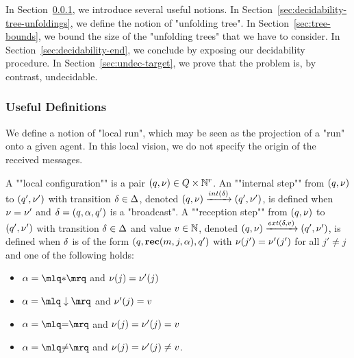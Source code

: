 In Section~\ref{sec:decidability-defs}, we introduce several useful notions. In Section~\ref{sec:decidability-tree-unfoldings}, we define the notion of "unfolding tree". In Section~\ref{sec:tree-bounds}, we bound the size of the "unfolding trees" that we have to consider. In Section~\ref{sec:decidability-end}, we conclude by exposing our decidability procedure. 
In Section~\ref{sec:undec-target}, we prove that the \TARGET problem is, by contrast, undecidable.

\subsubsection{Useful Definitions}
\label{sec:decidability-defs}

We define a notion of "local run", which may be seen as the projection of a "run" onto a given agent. In this local vision, we do not specify the origin of the received messages.
	
\AP A ""local configuration"" is a pair $(q, \nu) \in Q \times \mathbb{N}^r$.  
\AP An ""internal step"" from $(q,\nu)$ to $(q',\nu')$ with transition $\delta \in \Delta$, denoted $(q,\localdata) \intstep{\atrans} (q',\localdata')$, is defined when $\nu = \nu'$ and $\delta =(q, \alpha, q')$ is a "broadcast".  
\AP A ""reception step"" from $(q,\nu)$ to $(q',\nu')$ with transition $\delta \in \Delta$ and value $v \in \mathbb{N}$, denoted $(q,\localdata) \extbr{\atrans}{\aval} (q',\localdata')$, is defined when $\delta$ is of the form $(q,\textbf{rec}(m, j, \alpha),q')$ with $\nu(j') = \nu'(j')$ for all $j' \neq j$ and one of the following holds:
	
	\begin{minipage}[t]{6cm}
		\begin{itemize}
			\item $\anact = \quotemarks{\dummyact}$ 
			and $\nu(j) = \nu'(j)$
			\item $\anact = \quotemarks{\enregact}$ and $\nu'(j) = v$
		\end{itemize}
	\end{minipage}
	\begin{minipage}[t]{6cm}
		\begin{itemize}
			\item $\anact = \quotemarks{\eqtestact}$ and $\nu(j) = \nu'(j)= v$
			\item $\anact = \quotemarks{\diseqtestact}$ and $\nu(j) = \nu'(j) \ne v$.
		\end{itemize}
	\end{minipage}
	

